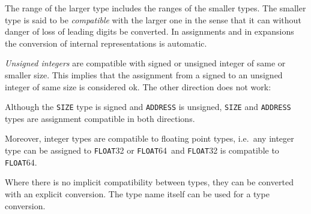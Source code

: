 \documentclass[a4wide,11pt]{article}
\newcommand{\FLOAT}{\lstinline"FLOAT"}
\begin{document}
The range of the larger type includes the ranges of the smaller types.
The smaller type is said to be \emph{compatible} with the larger one in the sense that it can without danger of loss of leading digits be converted.
In assignments and in expansions the conversion of internal representations is automatic.

\emph{Unsigned integers} are compatible with signed or unsigned integer of same or smaller size.
This implies that the assignment from a signed to an unsigned integer of same size is considered ok.
The other direction does not work:

Although the \verb+SIZE+ type is signed and \verb+ADDRESS+ is unsigned,  \verb"SIZE" and \verb"ADDRESS" types are assignment compatible in both directions.

Moreover, integer types are compatible to floating point types, i.e.\ any integer type can be assigned to \FLOAT32 or \FLOAT64\ and \FLOAT32 is compatible to \FLOAT64.

Where there is no implicit compatibility between types, they can be converted with an explicit conversion.
The type name itself can be used for a type conversion.
\end{document}
